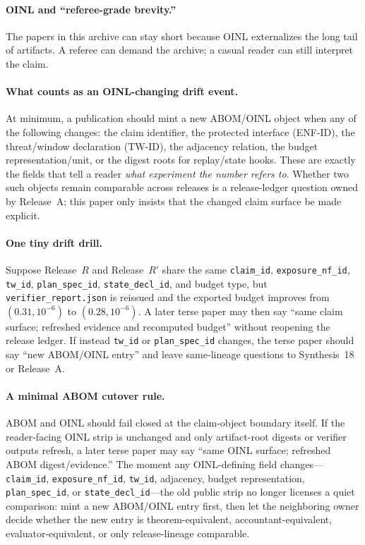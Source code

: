 \documentclass[11pt]{article}
\begin{document}
\paragraph{OINL and ``referee-grade brevity.''}
The papers in this archive can stay short because OINL externalizes the long tail of artifacts.
A referee can demand the archive; a casual reader can still interpret the claim.

\paragraph{What counts as an OINL-changing drift event.}
At minimum, a publication should mint a new ABOM/OINL object when any of the following changes: the claim identifier, the protected interface (ENF-ID), the threat/window declaration (TW-ID), the adjacency relation, the budget representation/unit, or the digest roots for replay/state hooks.
These are exactly the fields that tell a reader \emph{what experiment the number refers to}.
Whether two such objects remain comparable across releases is a release-ledger question owned by Release~A; this paper only insists that the changed claim surface be made explicit.\cite{series:releaseproperty}

\paragraph{One tiny drift drill.} Suppose Release~\(R\) and Release~\(R'\) share the same \texttt{claim\_id}, \texttt{exposure\_nf\_id}, \texttt{tw\_id}, \texttt{plan\_spec\_id}, \texttt{state\_decl\_id}, and budget type, but \texttt{verifier\_report.json} is reissued and the exported budget improves from \((0.31,10^{-6})\) to \((0.28,10^{-6})\). A later terse paper may then say ``same claim surface; refreshed evidence and recomputed budget'' without reopening the release ledger. If instead \texttt{tw\_id} or \texttt{plan\_spec\_id} changes, the terse paper should say ``new ABOM/OINL entry'' and leave same-lineage questions to Synthesis~18 or Release~A.\cite{series:planstateequiv,series:releaseproperty}

\paragraph{A minimal ABOM cutover rule.}
ABOM and OINL should fail closed at the claim-object boundary itself. If the reader-facing OINL strip is unchanged and only artifact-root digests or verifier outputs refresh, a later terse paper may say ``same OINL surface; refreshed ABOM digest/evidence.'' The moment any OINL-defining field changes---\texttt{claim\_id}, \texttt{exposure\_nf\_id}, \texttt{tw\_id}, adjacency, budget representation, \texttt{plan\_spec\_id}, or \texttt{state\_decl\_id}---the old public strip no longer licenses a quiet comparison: mint a new ABOM/OINL entry first, then let the neighboring owner decide whether the new entry is theorem-equivalent, accountant-equivalent, evaluator-equivalent, or only release-lineage comparable.
\end{document}

